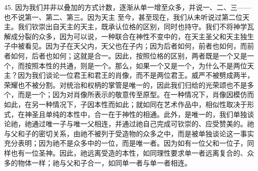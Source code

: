 45. 因为我们并非以叠加的方式计数，逐渐从单一增至众多，并说一、二、三——也不说第一、第二、第三。因为天主\newline{} 至今，甚至现在，我们从未听说过第二位天主。我们钦崇出自天主的天主，既承认位格的区别，同时也持守。我们不将神学瓦解成分裂的众多，因为可以说，一种联合在神性不变中的，在天主圣父和天主独生子中被看见。因为子在天父内，天父也在子内；因为后者如何，前者也如何，而前者如何，后者也如何；这就是合一。因此，按照位格的区别，两者既是一个又是一个，而按照本性的共通，则是一个。那么，如果一个又是一个，为什么不是两位天主？因为我们谈论一位君王和君王的肖像，而不是两位君王。威严不被劈成两半，荣耀也不被分割。对统治和权柄的掌管是唯一的，因此我们归给的光荣颂也不是多个，而是一个；因为对肖像所表示的敬意传至原型。在一种情况下，肖像因模仿而如此，在另一种情况下，子因本性而如此；就如同在艺术作品中，相似性取决于形式，在神圣且单纯的本性中，合一在于神性的相通。此外，是唯一的，我们单独谈论祂，祂通过唯一子与唯一父相连，并通过祂自己完成可钦崇的、应受赞美的。祂与父和子的密切关系，由祂不被列于受造物的众多之中，而是被单独谈论这一事实充分表明；因为祂不是众多中的一位，而是唯一者。因为如有一位父和一位子，同样也有一位圣神。因此，祂远离受造的本性，如同理性要求单一者远离复合的、众多的物体一样；祂与父和子合一，如同单一者与单一者相连。\par

